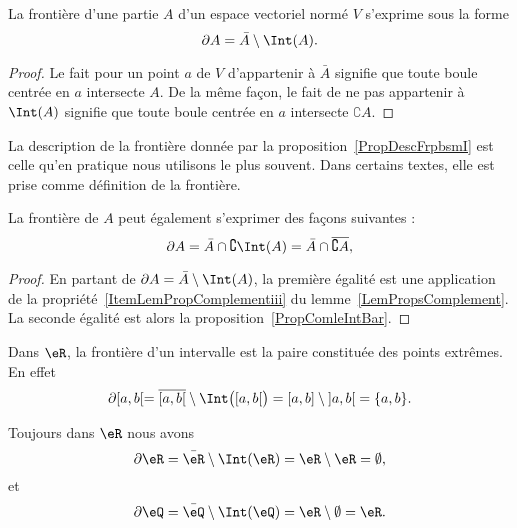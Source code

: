 \begin{proposition}		\label{PropDescFrpbsmI}
	La frontière d'une partie \( A\) d'un espace vectoriel normé \( V\) s'exprime sous la forme
	\begin{equation}
		\partial A=\bar A\setminus\Int(A).
	\end{equation}
\end{proposition}

\begin{proof}
	Le fait pour un point \( a\) de \( V\) d'appartenir à \( \bar A\) signifie que toute boule centrée en \( a\) intersecte \( A\). De la même façon, le fait de ne pas appartenir à \( \Int(A)\) signifie que toute boule centrée en \( a\) intersecte \( \complement A\).
\end{proof}

La description de la frontière donnée par la proposition~\ref{PropDescFrpbsmI} est celle qu'en pratique nous utilisons le plus souvent. Dans certains textes, elle est prise comme définition de la frontière.

\begin{lemma}
	La frontière de \( A\) peut également s'exprimer des façons suivantes :
	\begin{equation}
		\partial A= \bar A\cap\complement\Int(A)=\bar A\cap\overline{ \complement A },
	\end{equation}
\end{lemma}

\begin{proof}
	En partant de \( \partial A=\bar A\setminus \Int(A)\), la première égalité est une application de la propriété~\ref{ItemLemPropComplementiii} du lemme~\ref{LemPropsComplement}. La seconde égalité est alors la proposition~\ref{PropComleIntBar}.
\end{proof}

\begin{example}
	Dans \( \eR\), la frontière d'un intervalle est la paire constituée des points extrêmes. En effet
	\begin{equation}
		\partial\mathopen[ a , b [=\overline{ \mathopen[ a , b [ }\setminus\Int\big( \mathopen[ a , b [ \big)=\mathopen[ a , b \mathclose]\setminus\mathopen] a , b \mathclose[=\{ a,b \}.
	\end{equation}

	Toujours dans \( \eR\) nous avons
	\begin{equation}
		\partial\eR=\bar\eR\setminus\Int(\eR)=\eR\setminus\eR=\emptyset,
	\end{equation}
	et
	\begin{equation}
		\partial\eQ=\bar\eQ\setminus\Int(\eQ)=\eR\setminus\emptyset=\eR.
	\end{equation}
\end{example}

